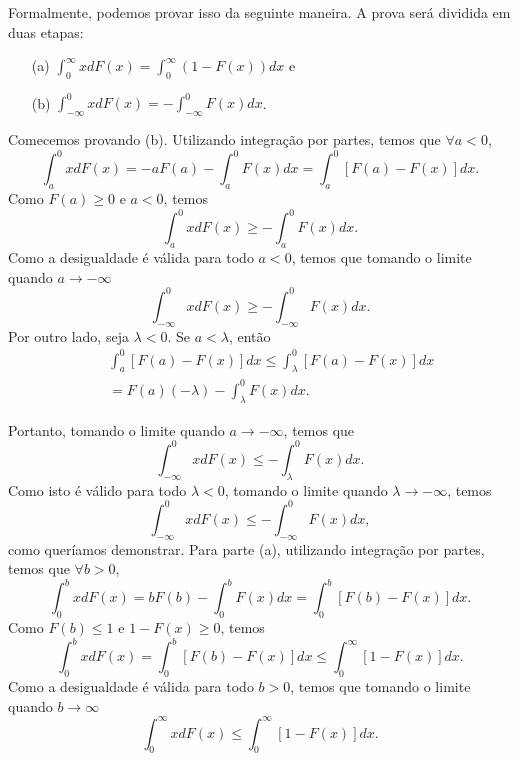 %
\begin{frame}
%
%
Formalmente, podemos provar isso da seguinte maneira. A prova será dividida em duas etapas:
\begin{enumerate}
\item[(a)] $\int_{0}^{\infty}xdF(x)=\int_{0}^{\infty}(1-F(x))dx$ e
\item[(b)] $\int_{-\infty}^{0}xdF(x)=-\int_{-\infty}^{0}F(x)dx$.
\end{enumerate}
Comecemos provando (b). Utilizando integração por partes, temos que $\forall a<0$,
$$ \int_{a}^{0}xdF(x)=-aF(a)-\int_{a}^{0}F(x)dx  =\int_{a}^{0}[F(a)-F(x)]dx.
$$
%
%
%
Como $F(a)\geq 0$ e $a<0$, temos
$$\int_{a}^{0}xdF(x)\geq -\int_{a}^{0}F(x)dx.$$
Como a desigualdade é válida para todo $a<0$, temos que tomando o limite quando $a\rightarrow -\infty$
$$\int_{-\infty}^{0}xdF(x)\geq -\int_{-\infty}^{0}F(x)dx.$$
Por outro lado, seja $\lambda<0$. Se $a<\lambda$, então
\begin{eqnarray}
& & \int_{a}^{0}[F(a)-F(x)]dx\leq \int_{\lambda}^{0}[F(a)-F(x)]dx\nonumber \\
& & =F(a)(-\lambda)-\int_{\lambda}^{0}F(x)dx. \nonumber
\end{eqnarray}

\end{frame}
%
\begin{frame}
%
Portanto, tomando o limite quando $a\rightarrow -\infty$, temos que
$$\int_{-\infty}^{0}xdF(x)\leq -\int_{\lambda}^{0}F(x)dx.$$
Como isto é válido para todo $\lambda<0$, tomando o limite quando $\lambda\rightarrow -\infty$, temos
$$\int_{-\infty}^{0}xdF(x)\leq -\int_{-\infty}^{0}F(x)dx,$$
como queríamos demonstrar.
%
%
%
%
Para parte (a), utilizando integração por partes, temos que $\forall b>0$,
$$\int_{0}^{b}xdF(x)=bF(b)-\int_{0}^{b}F(x)dx=\int_{0}^{b}[F(b)-F(x)]dx.$$
Como $F(b)\leq 1$ e $1-F(x)\geq 0$, temos
$$\int_{0}^{b}xdF(x)=\int_{0}^{b}[F(b)-F(x)]dx\leq \int_{0}^{\infty}[1-F(x)]dx.$$
Como a desigualdade é válida para todo $b>0$, temos que tomando o limite quando $b\rightarrow\infty$
$$\int_{0}^{\infty}xdF(x)\leq\int_{0}^{\infty}[1-F(x)]dx.$$

\end{frame}

